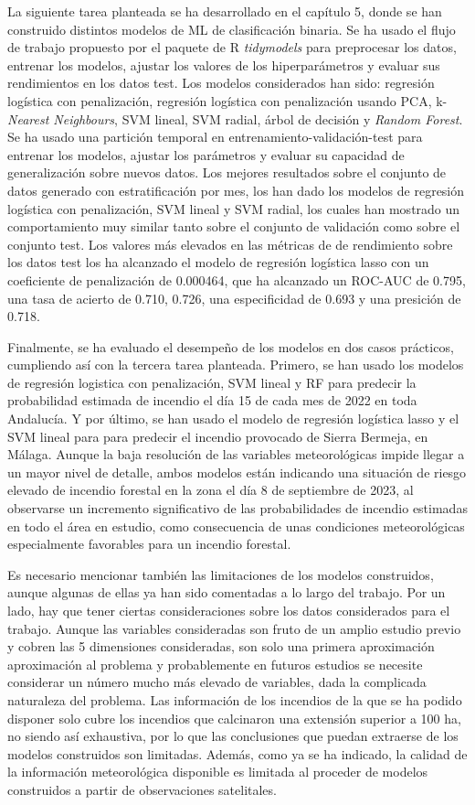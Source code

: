 \documentclass[12pt,a4paper,]{book}
\numberwithin{dummy}{section}
\theoremstyle{ocrenumbox}
\theoremstyle{blacknumex}
\theoremstyle{blacknumbox}
\theoremstyle{ocrenum}
\theoremstyle{ocrenum}
\begin{document}
La siguiente tarea planteada se ha desarrollado en el capítulo 5, donde
se han construido distintos modelos de ML de clasificación binaria. Se
ha usado el flujo de trabajo propuesto por el paquete de R
\emph{tidymodels} para preprocesar los datos, entrenar los modelos,
ajustar los valores de los hiperparámetros y evaluar sus rendimientos en
los datos test. Los modelos considerados han sido: regresión logística
con penalización, regresión logística con penalización usando PCA,
k-\emph{Nearest Neighbours}, SVM lineal, SVM radial, árbol de decisión y
\emph{Random Forest}. Se ha usado una partición temporal en
entrenamiento-validación-test para entrenar los modelos, ajustar los
parámetros y evaluar su capacidad de generalización sobre nuevos datos.
Los mejores resultados sobre el conjunto de datos generado con
estratificación por mes, los han dado los modelos de regresión logística
con penalización, SVM lineal y SVM radial, los cuales han mostrado un
comportamiento muy similar tanto sobre el conjunto de validación como
sobre el conjunto test. Los valores más elevados en las métricas de de
rendimiento sobre los datos test los ha alcanzado el modelo de regresión
logística lasso con un coeficiente de penalización de 0.000464, que ha
alcanzado un ROC-AUC de 0.795, una tasa de acierto de 0.710, 0.726, una
especificidad de 0.693 y una presición de 0.718.

Finalmente, se ha evaluado el desempeño de los modelos en dos casos
prácticos, cumpliendo así con la tercera tarea planteada. Primero, se
han usado los modelos de regresión logistica con penalización, SVM
lineal y RF para predecir la probabilidad estimada de incendio el día 15
de cada mes de 2022 en toda Andalucía. Y por último, se han usado el
modelo de regresión logística lasso y el SVM lineal para para predecir
el incendio provocado de Sierra Bermeja, en Málaga. Aunque la baja
resolución de las variables meteorológicas impide llegar a un mayor
nivel de detalle, ambos modelos están indicando una situación de riesgo
elevado de incendio forestal en la zona el día 8 de septiembre de 2023,
al observarse un incremento significativo de las probabilidades de
incendio estimadas en todo el área en estudio, como consecuencia de unas
condiciones meteorológicas especialmente favorables para un incendio
forestal.

Es necesario mencionar también las limitaciones de los modelos
construidos, aunque algunas de ellas ya han sido comentadas a lo largo
del trabajo. Por un lado, hay que tener ciertas consideraciones sobre
los datos considerados para el trabajo. Aunque las variables
consideradas son fruto de un amplio estudio previo y cobren las 5
dimensiones consideradas, son solo una primera aproximación aproximación
al problema y probablemente en futuros estudios se necesite considerar
un número mucho más elevado de variables, dada la complicada naturaleza
del problema. Las información de los incendios de la que se ha podido
disponer solo cubre los incendios que calcinaron una extensión superior
a 100 ha, no siendo así exhaustiva, por lo que las conclusiones que
puedan extraerse de los modelos construidos son limitadas. Además, como
ya se ha indicado, la calidad de la información meteorológica disponible
es limitada al proceder de modelos construidos a partir de observaciones
satelitales.
\end{document}
